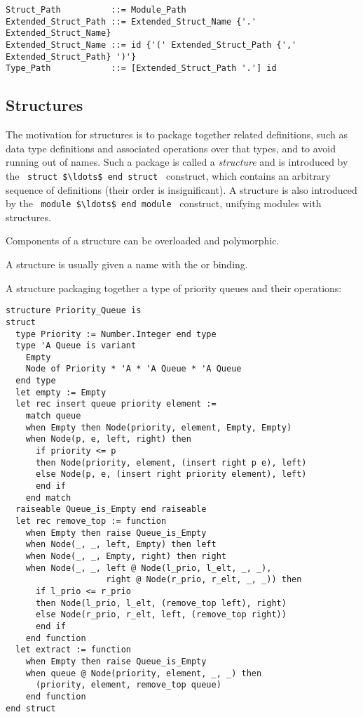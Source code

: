 \begin{lstlisting}
Struct_Path          ::= Module_Path
Extended_Struct_Path ::= Extended_Struct_Name {'.' Extended_Struct_Name}
Extended_Struct_Name ::= id {'(' Extended_Struct_Path {',' Extended_Struct_Path} ')'}
Type_Path            ::= [Extended_Struct_Path '.'] id
\end{lstlisting}






\subsection{Structures}

The motivation for structures is to package together related definitions, such as data type definitions and associated operations over that types, and to avoid running out of names. Such a package is called a {\em structure} and is introduced by the ~\lstinline!struct $\ldots$ end struct!~ construct, which contains an arbitrary sequence of definitions (their order is insignificant). A structure is also introduced by the ~\lstinline!module $\ldots$ end module!~ construct, unifying modules with structures. 

Components of a structure can be overloaded and polymorphic. 

A structure is usually given a name with the  or  binding. 

\example A structure packaging together a type of priority queues and their operations:
\begin{lstlisting}
structure Priority_Queue is
struct
  type Priority := Number.Integer end type
  type 'A Queue is variant 
    Empty
    Node of Priority * 'A * 'A Queue * 'A Queue
  end type
  let empty := Empty
  let rec insert queue priority element :=
    match queue
    when Empty then Node(priority, element, Empty, Empty)
    when Node(p, e, left, right) then
      if priority <= p
      then Node(priority, element, (insert right p e), left)
      else Node(p, e, (insert right priority element), left)
      end if
    end match
  raiseable Queue_is_Empty end raiseable
  let rec remove_top := function
    when Empty then raise Queue_is_Empty
    when Node(_, _, left, Empty) then left
    when Node(_, _, Empty, right) then right
    when Node(_, _, left @ Node(l_prio, l_elt, _, _), 
                    right @ Node(r_prio, r_elt, _, _)) then
      if l_prio <= r_prio
      then Node(l_prio, l_elt, (remove_top left), right)
      else Node(r_prio, r_elt, left, (remove_top right))
      end if
    end function
  let extract := function
    when Empty then raise Queue_is_Empty
    when queue @ Node(priority, element, _, _) then
      (priority, element, remove_top queue)
    end function
end struct
\end{lstlisting}

